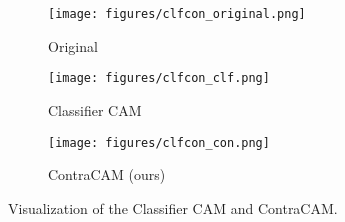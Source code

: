 \begin{figure}[ht]
\centering\small
\begin{subfigure}{0.24\textwidth}
\texttt{[image: figures/clfcon\_original.png]}
\caption{Original}
\end{subfigure}
\begin{subfigure}{0.24\textwidth}
\texttt{[image: figures/clfcon\_clf.png]}
\caption{Classifier CAM}
\end{subfigure}
\begin{subfigure}{0.24\textwidth}
\texttt{[image: figures/clfcon\_con.png]}
\caption{ContraCAM (ours)}
\end{subfigure}
\caption{
Visualization of the Classifier CAM and ContraCAM.
}\label{fig:loc-clfcon}
\end{figure}
